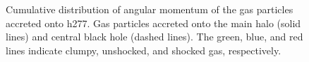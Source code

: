 \documentclass[manuscript]{aastex}
\begin{document}
\begin{figure}
\centerline{}
\caption[]{ Cumulative distribution of angular momentum of the gas particles accreted onto h277.  Gas particles accreted onto the main halo (solid lines) and central black hole (dashed lines). The green, blue, and red lines indicate clumpy, unshocked, and shocked gas, respectively.}
\label{h277angmom} 
\end{figure}



\end{document}
